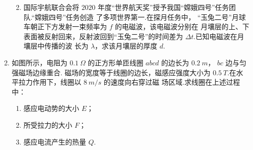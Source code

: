 \begin{enumerate}
\begin{enumerate}





\item 
国际宇航联合会将 $ 2020 $ 年度“世界航天奖”授予我国“嫦娥四号”任务团队.“嫦娥四号”任务创造
了多项世界第一.在探月任务中，
“玉兔二号”月球车朝正下方发射一束频率为 $ f $ 的电磁波，该电磁波分别在
月壤层的上、下表面被反射回来，反射波回到“玉兔二号”的时间差为 $ \Delta t $.已知电磁波在月壤层中传播的波
长为 $ \lambda $，求该月壤层的厚度 $ d $.






\end{enumerate}



\gaokaojs



\item
如图所示，电阻为 $ 0.1 \ \Omega $ 的正方形单匝线圈 $ abcd $ 的边长为 $ 0.2 \ m $， $ bc $ 边与匀强磁场边缘重合.
磁场的宽度等于线圈的边长，磁感应强度大小为 $ 0.5 \ T $.在水平拉力作用下，线圈以 $ 8 \ m/s $ 的速度向右穿过磁
场区域.求线圈在上述过程中：
\begin{enumerate}
\item
感应电动势的大小 $ E $；
\item 
所受拉力的大小 $ F $；
\item 
感应电流产生的热量 $ Q $.

\end{enumerate}
\begin{figure}[h!]
\flushright

\end{figure}



\end{enumerate}
